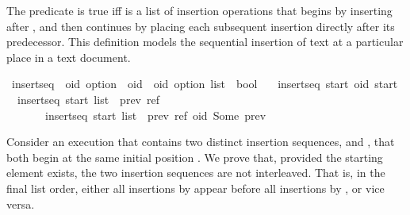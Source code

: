 The predicate  is true iff  is a list of insertion operations that begins by inserting after , and then continues by placing each subsequent insertion directly after its predecessor.
This definition models the sequential insertion of text at a particular place in a text document.%
\begin{isabelle}
\isamarkupfalse%
\ insert{\isacharunderscore}seq\ {\isacharcolon}{\isacharcolon}\ {\isachardoublequoteopen}{\isacharprime}oid\ option\ {\isasymRightarrow}\ {\isacharparenleft}{\isacharprime}oid\ {\isasymtimes}\ {\isacharprime}oid\ option{\isacharparenright}\ list\ {\isasymRightarrow}\ bool{\isachardoublequoteclose}\ \isanewline
\ \ {\isachardoublequoteopen}insert{\isacharunderscore}seq\ start\ {\isacharbrackleft}{\isacharparenleft}oid{\isacharcomma}\ start{\isacharparenright}{\isacharbrackright}{\isachardoublequoteclose}\ {\isacharbar}\isanewline
\ \ {\isachardoublequoteopen}{\isasymlbrakk}insert{\isacharunderscore}seq\ start\ {\isacharparenleft}list\ {\isacharat}\ {\isacharbrackleft}{\isacharparenleft}prev{\isacharcomma}\ ref{\isacharparenright}{\isacharbrackright}{\isacharparenright}{\isasymrbrakk}\isanewline
\ \ \ \ \ \ {\isasymLongrightarrow}\ insert{\isacharunderscore}seq\ start\ {\isacharparenleft}list\ {\isacharat}\ {\isacharbrackleft}{\isacharparenleft}prev{\isacharcomma}\ ref{\isacharparenright}{\isacharcomma}\ {\isacharparenleft}oid{\isacharcomma}\ Some\ prev{\isacharparenright}{\isacharbrackright}{\isacharparenright}{\isachardoublequoteclose}
\end{isabelle}

Consider an execution that contains two distinct insertion sequences,  and , that both begin at the same initial position .
We prove that, provided the starting element exists, the two insertion sequences are not interleaved.
That is, in the final list order, either all insertions by  appear before all insertions by , or vice versa.

